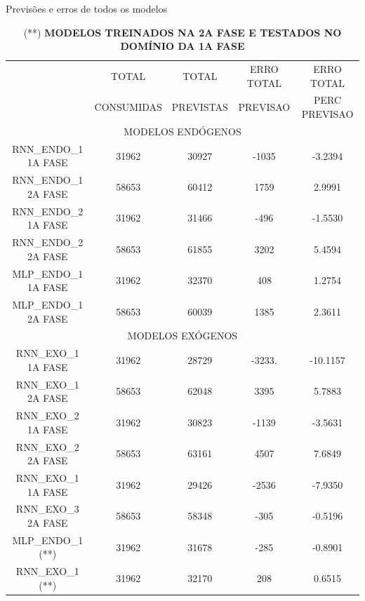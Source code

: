         \begin{table}[!ht]
        \caption{Previsões e erros de todos os modelos}
        \begin{adjustbox}{width=\columnwidth,center}
           \begin{tabular}{ | c | c| c | c| c | }
     \rowcolor{gray!50}
    \multirow{2}{*}{	MODELO} & TOTAL  & TOTAL  & ERRO TOTAL & ERRO TOTAL  \\ \rowcolor{gray!50}
   &                        CONSUMIDAS & PREVISTAS &  PREVISAO &  PERC PREVISAO  \\ 
    \multicolumn{5}{c}{	MODELOS ENDÓGENOS }  \\ \hline
	RNN\_ENDO\_1 1A FASE & 31962 & 30927 & -1035 & -3.2394 \\ \hline
	RNN\_ENDO\_1 2A FASE & 58653 & 60412 & 1759 & 2.9991 \\ \hline
	RNN\_ENDO\_2 1A FASE & 31962 & 31466 & -496 & -1.5530 \\ \hline
	RNN\_ENDO\_2 2A FASE & 58653 & 61855 & 3202 & 5.4594 \\ \hline
	MLP\_ENDO\_1 1A FASE & 31962 & 32370 & 408 & 1.2754 \\ \hline
	MLP\_ENDO\_1 2A FASE & 58653 & 60039 & 1385 & 2.3611 \\ \hline
	\multicolumn{5}{c}{ MODELOS EXÓGENOS }\\ \hline
	RNN\_EXO\_1 1A FASE & 31962 & 28729 & -3233. & -10.1157 \\ \hline
	RNN\_EXO\_1 2A FASE & 58653 & 62048 & 3395 & 5.7883 \\ \hline
	RNN\_EXO\_2 1A FASE & 31962 & 30823 & -1139& -3.5631 \\ \hline
	RNN\_EXO\_2 2A FASE & 58653 & 63161 & 4507 & 7.6849 \\ \hline
	RNN\_EXO\_1 1A FASE & 31962 & 29426 & -2536 & -7.9350 \\ \hline
	RNN\_EXO\_3 2A FASE & 58653 & 58348 & -305 & -0.5196 \\ \hline
	MLP\_ENDO\_1 (**) & 31962 & 31678 & -285 & -0.8901 \\ \hline
	RNN\_EXO\_1 (**) & 31962 & 32170 & 208 & 0.6515 \\ \hline
\end{tabular} \end{adjustbox}\caption*{(**) \textbf{MODELOS TREINADOS NA 2A FASE E TESTADOS NO DOMÍNIO DA 1A FASE}} \end{table} 

